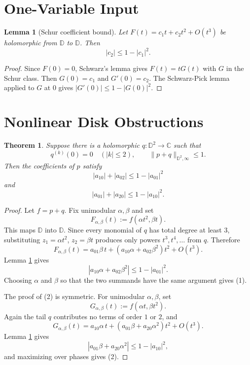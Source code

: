 \documentclass[11pt]{article}
\newtheorem{theorem}{Theorem}
\newtheorem{lemma}{Lemma}
\begin{document}
\section*{One-Variable Input}

\begin{lemma}[Schur coefficient bound]\label{lem:schur}
Let \(F(t)=c_1t+c_2t^2+O(t^3)\) be holomorphic from \(\mathbb D\) to
\(\mathbb D\).  Then
\[
|c_2|\le 1-|c_1|^2.
\]
\end{lemma}

\begin{proof}
Since \(F(0)=0\), Schwarz's lemma gives \(F(t)=tG(t)\) with \(G\) in the
Schur class.  Then \(G(0)=c_1\) and \(G'(0)=c_2\).  The Schwarz-Pick lemma
applied to \(G\) at \(0\) gives \(|G'(0)|\le 1-|G(0)|^2\).
\end{proof}

\section*{Nonlinear Disk Obstructions}

\begin{theorem}\label{thm:nonlinear-obstructions}
Suppose there is a holomorphic \(q:\mathbb D^2\to\mathbb C\) such that
\[
q^{(k)}(0)=0\quad (|k|\le 2),
\qquad
\|p+q\|_{\mathbb D^2,\infty}\le 1.
\]
Then the coefficients of \(p\) satisfy
\[
|a_{10}|+|a_{02}|\le 1-|a_{01}|^2
\tag{1}
\]
and
\[
|a_{01}|+|a_{20}|\le 1-|a_{10}|^2.
\tag{2}
\]
\end{theorem}

\begin{proof}
Let \(f=p+q\).  Fix unimodular \(\alpha,\beta\) and set
\[
F_{\alpha,\beta}(t):=f(\alpha t^2,\beta t).
\]
This maps \(\mathbb D\) into \(\mathbb D\).  Since every monomial of \(q\) has
total degree at least \(3\), substituting \(z_1=\alpha t^2\), \(z_2=\beta t\)
produces only powers \(t^3,t^4,\ldots\) from \(q\).  Therefore
\[
F_{\alpha,\beta}(t)
=a_{01}\beta\,t+(a_{10}\alpha+a_{02}\beta^2)t^2+O(t^3).
\]
Lemma \ref{lem:schur} gives
\[
|a_{10}\alpha+a_{02}\beta^2|\le 1-|a_{01}|^2.
\]
Choosing \(\alpha\) and \(\beta\) so that the two summands have the same
argument gives (1).

The proof of (2) is symmetric.  For unimodular \(\alpha,\beta\), set
\[
G_{\alpha,\beta}(t):=f(\alpha t,\beta t^2).
\]
Again the tail \(q\) contributes no terms of order \(1\) or \(2\), and
\[
G_{\alpha,\beta}(t)
=a_{10}\alpha\,t+(a_{01}\beta+a_{20}\alpha^2)t^2+O(t^3).
\]
Lemma \ref{lem:schur} gives
\[
|a_{01}\beta+a_{20}\alpha^2|\le 1-|a_{10}|^2,
\]
and maximizing over phases gives (2).
\end{proof}
\end{document}
